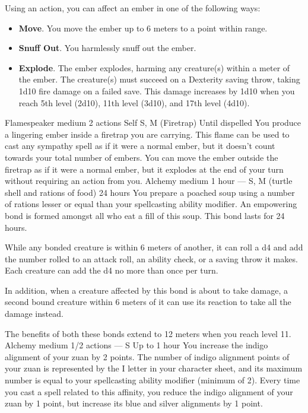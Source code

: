     Using an action, you can affect an ember in one of the following ways:
    \begin{itemize}
        \item \textbf{Move}.
        You move the ember up to 6 meters to a point within range.
        \item \textbf{Snuff Out}.
        You harmlessly snuff out the ember.
        \item \textbf{Explode}.
        The ember explodes, harming any creature(s) within a meter of the ember.
        The creature(s) must succeed on a Dexterity saving throw, taking 1d10 fire damage on a failed save.
        This damage increases by 1d10 when you reach 5th level (2d10), 11th level (3d10), and 17th level (4d10).
    \end{itemize}
    {Flamespeaker medium}
    {2 actions}
    {Self}
    {S, M (Firetrap)}
    {Until dispelled}
    You produce a lingering ember inside a firetrap you are carrying.
    This flame can be used to cast any sympathy spell as if it were a normal ember, but it doesn't count towards your total number of embers.
    You can move the ember outside the firetrap as if it were a normal ember, but it explodes at the end of your turn without requiring an action from you.
    {Alchemy medium}
    {1 hour}
    {---}
    {S, M (turtle shell and rations of food)}
    {24 hours}
    You prepare a poached soup using a number of rations lesser or equal than your spellcasting ability modifier.
    An empowering bond is formed amongst all who eat a fill of this soup.
    This bond lasts for 24 hours.

    While any bonded creature is within 6 meters of another, it can roll a d4 and add the number rolled to an attack roll, an ability check, or a saving throw it makes.
    Each creature can add the d4 no more than once per turn.

    In addition, when a creature affected by this bond is about to take damage, a second bound creature within 6 meters of it can use its reaction to take all the damage instead.

    The benefits of both these bonds extend to 12 meters when you reach level 11.
    {Alchemy medium}
    {1/2 actions}
    {---}
    {S}
    {Up to 1 hour}
    You increase the indigo alignment of your zuan by 2 points.
    The number of indigo alignment points of your zuan is represented by the I letter in your character sheet, and its maximum number is equal to your spellcasting ability modifier (minimum of 2).
    Every time you cast a spell related to this affinity, you reduce the indigo alignment of your zuan by 1 point, but increase its blue and silver alignments by 1 point.

